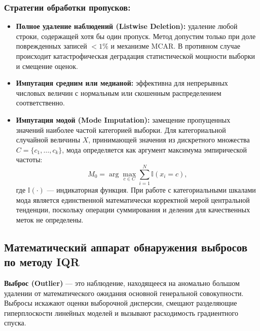 \documentclass[14pt,a4paper]{extarticle}
\begin{document}
\subsubsection{Стратегии обработки пропусков:}
\begin{itemize}
    \item \textbf{Полное удаление наблюдений (Listwise Deletion):} удаление любой строки, содержащей хотя бы один пропуск. Метод допустим только при доле поврежденных записей $<1\%$ и механизме MCAR. В противном случае происходит катастрофическая деградация статистической мощности выборки и смещение оценок.
    \item \textbf{Импутация средним или медианой:} эффективна для непрерывных числовых величин с нормальным или скошенным распределением соответственно.
    \item \textbf{Импутация модой (Mode Imputation):} замещение пропущенных значений наиболее частой категорией выборки. Для категориальной случайной величины $X$, принимающей значения из дискретного множества $C = \{c_1, \dots, c_k\}$, мода определяется как аргумент максимума эмпирической частоты:
    \begin{equation}
        M_0 = \arg\max_{c \in C} \sum_{i=1}^N \mathbb{I}(x_i = c),
    \end{equation}
    где $\mathbb{I}(\cdot)$ --- индикаторная функция. При работе с категориальными шкалами мода является единственной математически корректной мерой центральной тенденции, поскольку операции суммирования и деления для качественных меток не определены.
\end{itemize}

\subsection{Математический аппарат обнаружения выбросов по методу IQR}

\textbf{Выброс (Outlier)} --- это наблюдение, находящееся на аномально большом удалении от математического ожидания основной генеральной совокупности. Выбросы искажают оценки выборочной дисперсии, смещают разделяющие гиперплоскости линейных моделей и вызывают расходимость градиентного спуска.
\end{document}
